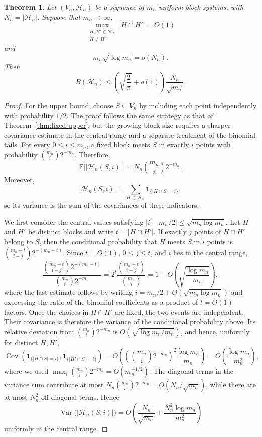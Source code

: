 \documentclass[10pt,a4paper]{amsart}
\newtheorem{theorem}{Theorem}
\begin{document}
	\begin{theorem}
		\label{thm:growing-upper}
		{Let \((V_n,\mathcal H_n)\) be a sequence of \(m_n\)-uniform block systems,
			with \(N_n=|\mathcal H_n|\). Suppose that \(m_n\to\infty\),
			\[
			\max_{\substack{H,H'\in\mathcal H_n\\H\neq H'}}|H\cap H'|=O(1)
			\]
			and
			\[
			m_n\sqrt{\log m_n}=o(N_n).
			\]
			Then
			\[
			B(\mathcal H_n)\leq
			\left(\sqrt{\frac{2}{\pi}}+o(1)\right)
			\frac{N_n}{\sqrt{m_n}}.
			\]}
	\end{theorem}

	\begin{proof} For the upper bound, choose \(S\subseteq V_n\) by including each point independently with probability \(1/2\). The proof follows the same strategy as that of Theorem~\ref{thm:fixed-upper}, but the growing block size requires a sharper covariance estimate in the central range and a separate treatment of the binomial tails. For every \(0\leq i\leq m_n\), a fixed block meets \(S\) in exactly \(i\) points with probability \(\binom{m_n}{i}2^{-m_n}\). Therefore,
		\[
		\mathbb E\bigl[|\mathcal H_n(S,i)|\bigr]
		=N_n\binom{m_n}{i}2^{-m_n}.
		\]
		Moreover,
		\[
		|\mathcal H_n(S,i)|
		=\sum_{H\in\mathcal H_n}\mathbf 1_{\{|H\cap S|=i\}},
		\]
		so its variance is the sum of the covariances of these indicators.
		
		We first consider the central values satisfying
		\(\left|i-m_n/2\right|\leq\sqrt{m_n\log m_n}\). Let \(H\) and \(H'\)
		be distinct blocks and write \(t=|H\cap H'|\). If exactly \(j\) points
		of \(H\cap H'\) belong to \(S\), then the conditional probability that
		\(H\) meets \(S\) in \(i\) points is
		\(\binom{m_n-t}{i-j}2^{-(m_n-t)}\). Since \(t=O(1)\),
		\(0\leq j\leq t\), and \(i\) lies in the central range,
		\[
		\frac{\binom{m_n-t}{i-j}2^{-(m_n-t)}}
		{\binom{m_n}{i}2^{-m_n}}
		=
		2^t\frac{\binom{m_n-t}{i-j}}{\binom{m_n}{i}}
		=
		1+O\left(\sqrt{\frac{\log m_n}{m_n}}\right),
		\]
		where the last estimate follows by writing
		\(i=m_n/2+O(\sqrt{m_n\log m_n})\) and expressing the ratio of the
		binomial coefficients as a product of \(t=O(1)\) factors. Once the
		choices in \(H\cap H'\) are fixed, the two events are independent.
		Their covariance is therefore the variance of the conditional probability
		above. Its relative deviation from
		\(\binom{m_n}{i}2^{-m_n}\) is
		\(O(\sqrt{\log m_n/m_n})\), and hence, uniformly for distinct \(H,H'\),
		\[
		\operatorname{Cov}\left(
		\mathbf 1_{\{|H\cap S|=i\}},
		\mathbf 1_{\{|H'\cap S|=i\}}
		\right)
		=
		O\left(
		\left(\binom{m_n}{i}2^{-m_n}\right)^2
		\frac{\log m_n}{m_n}
		\right)
		=
		O\left(\frac{\log m_n}{m_n^2}\right),
		\]
		where we used
		\(\max_i\binom{m_n}{i}2^{-m_n}=O(m_n^{-1/2})\). The diagonal terms in the variance sum contribute at most \(N_n\binom{m_n}{i}2^{-m_n}=O(N_n/\sqrt{m_n})\), while there are at most \(N_n^2\) off-diagonal terms. Hence
		\[
		\operatorname{Var}\bigl(|\mathcal H_n(S,i)|\bigr)
		=
		O\left(
		\frac{N_n}{\sqrt{m_n}}
		+\frac{N_n^2\log m_n}{m_n^2}
		\right)
		\]
		uniformly in the central range.
		

\end{proof}
\end{document}
